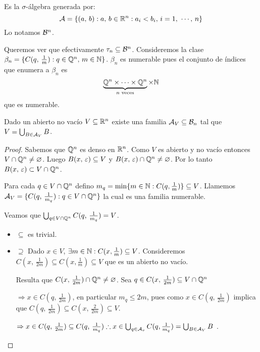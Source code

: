 \clearpage

\begin{definition}
    Es la $\sigma$-álgebra generada por:
    \begin{equation*}
        \mathcal{A} = \{ (a\text{, } b) : a\text{, } b \in \mathbb{R}^n : a_i < b_i \text{, } i = 1\text{, } \cdots \text{, } n \}
    \end{equation*}
    Lo notamos $\mathcal{B}^n$.
\end{definition}

Queremos ver que efectivamente $\tau_n \subseteq \mathcal{B}^n$.
Consideremos la clase $\beta_n = \{ C(q\text{, } \frac{1}{m}) : q \in \mathbb{Q}^n\text{, } m \in \mathbb{N} \}$.
$\beta_n$ es numerable pues el conjunto de índices que enumera a $\beta_n$ es
\[ \underbrace{\mathbb{Q}^n \times \cdots \times \mathbb{Q}^n}_{n \text{ veces}} \times \mathbb{N} \] que es numerable.

\begin{prop}
    Dado un abierto no vacío $V \subseteq \mathbb{R}^n$ existe una familia $\mathcal{A}_V \subseteq \mathcal{B}_n$ tal que
    $V = \bigcup_{B \in \mathcal{A}_V} B$.

    \begin{proof}
        Sabemos que $\mathbb{Q}^n$ es denso en $\mathbb{R}^n$. Como $V$ es abierto y no vacío entonces $V \cap \mathbb{Q}^n \neq \varnothing$.
        Luego $B(x\text{, } \varepsilon) \subseteq V$ y $B(x\text{, } \varepsilon) \cap \mathbb{Q}^n \neq \varnothing$. Por lo tanto $B(x\text{, } \varepsilon) \subset V \cap \mathbb{Q}^n$.

        Para cada $q \in V \cap \mathbb{Q}^n$ defino $m_q = \min\{ m \in \mathbb{N} : C(q, \frac{1}{m}) \} \subseteq V$.
        Llamemos $\mathcal{A}_V = \{ C(q\text{, } \frac{1}{m_q}) : q \in V \cap \mathbb{Q}^n \}$ la cual es una familia numerable.

        Veamos que $\bigcup_{q \in V \cap \mathbb{Q}^n} C(q\text{, } \frac{1}{m_q}) = V$.
        \begin{itemize}
            \item $\subseteq$ es trivial.
            \item $\supseteq$ Dado $x \in V$, $\exists m \in \mathbb{N} : C(x, \frac{1}{m}) \subseteq V$. Consideremos
                  $C(x\text{, } \frac{1}{2m}) \subseteq C(x, \frac{1}{m}) \subseteq V$ que es un abierto no vacío.

                  Resulta que $C(x\text{, } \frac{1}{2m}) \cap \mathbb{Q}^n \neq \varnothing$.
                  Sea $q \in C(x\text{, } \frac{1}{2m}) \subseteq V \cap \mathbb{Q}^n$

                  $\Rightarrow x \in C(q\text{, } \frac{1}{2m})$, en particular $m_q \leq 2m$, pues como $x \in C(q\text{, } \frac{1}{2m})$
                  implica que $C(q\text{, } \frac{1}{2m}) \subseteq C(x\text{, } \frac{2}{2m}) \subseteq V$.

                  $\Rightarrow x \in C(q\text{, } \frac{1}{2m}) \subseteq C(q\text{, } \frac{1}{m_q}) \therefore x \in \bigcup_{q \in \mathcal{A}_v} C(q, \frac{1}{m_q}) = \bigcup_{B \in \mathcal{A}_V} B$ .
        \end{itemize}
    \end{proof}
\end{prop}

